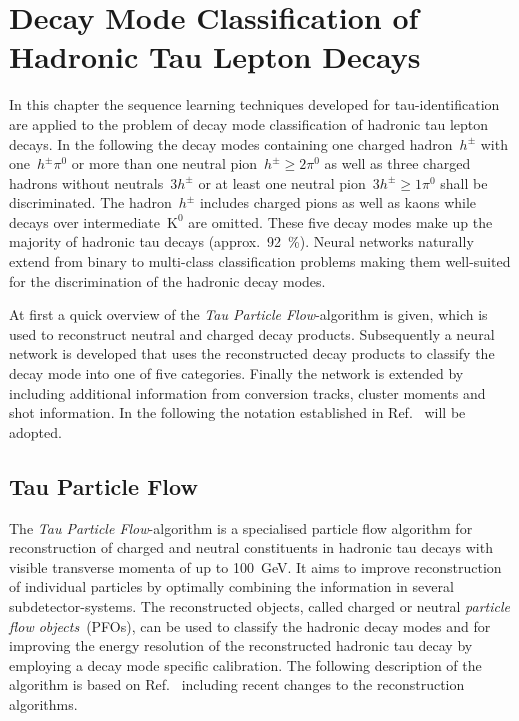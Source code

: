 \chapter{Decay Mode Classification of Hadronic Tau Lepton Decays}
\label{sec:decaymode}

In this chapter the sequence learning techniques developed for
tau-identification are applied to the problem of decay mode classification of
hadronic tau lepton decays. In the following the decay modes containing one
charged hadron~$h^\pm$ with one~$h^\pm \pi^0$ or more than one neutral
pion~$h^\pm \geq 2\pi^0$ as well as three charged hadrons without
neutrals~$3h^\pm$ or at least one neutral pion~$3h^\pm \geq 1\pi^0$ shall be
discriminated. The hadron~$h^\pm$ includes charged pions as well as kaons while
decays over intermediate~$\text{K}^0$ are omitted. These five decay modes make
up the majority of hadronic tau decays (approx.\ \SI{92}{\percent}). Neural
networks naturally extend from binary to multi-class classification problems
making them well-suited for the discrimination of the hadronic decay modes.

At first a quick overview of the \emph{Tau Particle Flow}-algorithm is given,
which is used to reconstruct neutral and charged decay products. Subsequently a
neural network is developed that uses the reconstructed decay products to
classify the decay mode into one of five categories. Finally the network is
extended by including additional information from conversion tracks, cluster
moments and shot information. In the following the notation established in
Ref.~\cite{atlas:taurec:decaymodes} will be adopted.



\section{Tau Particle Flow}
\label{sec:tau_pflow}

The \emph{Tau Particle Flow}-algorithm is a specialised particle flow algorithm
for reconstruction of charged and neutral constituents in hadronic tau decays
with visible transverse momenta of up to \SI{100}{\giga\electronvolt}. It aims
to improve reconstruction of individual particles by optimally combining the
information in several subdetector-systems. The reconstructed objects, called
charged or neutral \emph{particle flow objects}~(PFOs), can be used to classify
the hadronic decay modes and for improving the energy resolution of the
reconstructed hadronic tau decay by employing a decay mode specific calibration.
The following description of the algorithm is based on
Ref.~\cite{atlas:taurec:decaymodes} including recent changes to the reconstruction
algorithms.

